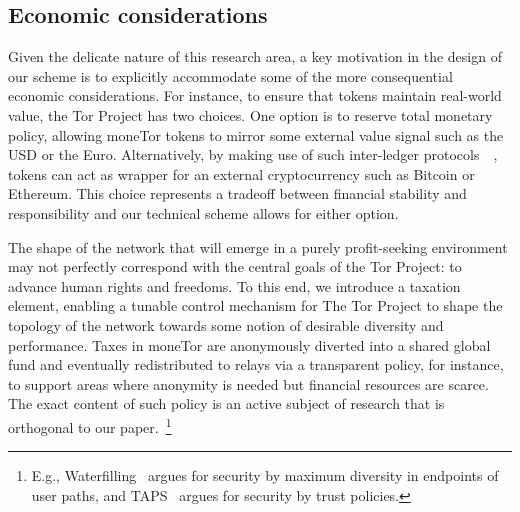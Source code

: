 
\subsection{Economic considerations}



Given the delicate nature of this research area, a key motivation in the design
of our scheme is to explicitly accommodate some of the more consequential
economic considerations. For instance, to ensure that tokens maintain real-world
value, the Tor Project has two choices. One option is to reserve total monetary
policy, allowing moneTor tokens to mirror some external value signal such as the
USD or the Euro. Alternatively, by making use of such inter-ledger
protocols~\cite{back2014enabling}~\cite{poon2017plasma}, tokens can act as
wrapper for an external cryptocurrency such as Bitcoin or Ethereum. This choice
represents a tradeoff between financial stability and responsibility and our
technical scheme allows for either option.

The shape of the network that will emerge in a purely profit-seeking environment
may not perfectly correspond with the central goals of the Tor Project: to
advance human rights and freedoms. To this end, we introduce a taxation element,
enabling a tunable control mechanism for The Tor Project to shape the topology
of the network towards some notion of desirable diversity and performance. Taxes
in moneTor are anonymously diverted into a shared global fund and eventually
redistributed to relays via a transparent policy, for instance, to support areas
where anonymity is needed but financial resources are scarce. The exact content
of such policy is an active subject of research that is orthogonal to our
paper.~\footnote{E.g., Waterfilling~\cite{waterfilling-pets2017} argues for
  security by maximum diversity in endpoints of user paths, and
  TAPS~\cite{taps-ndss2017} argues for security by trust policies.}

